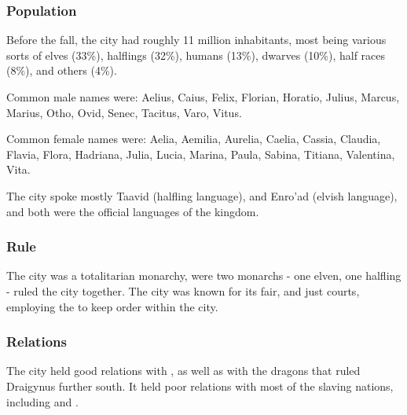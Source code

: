 \subsubsection{Population}

Before the fall, the city had roughly 11 million inhabitants, most being
various sorts of elves (33\%), halflings (32\%), humans (13\%), dwarves
(10\%), half races (8\%), and others (4\%).

Common male names were: Aelius, Caius, Felix, Florian, Horatio, Julius, Marcus,
Marius, Otho, Ovid, Senec, Tacitus, Varo, Vitus.

Common female names were: Aelia, Aemilia, Aurelia, Caelia, Cassia, Claudia,
Flavia, Flora, Hadriana, Julia, Lucia, Marina, Paula, Sabina, Titiana,
Valentina, Vita.

The city spoke mostly Taavid (halfling language), and Enro'ad (elvish language),
and both were the official languages of the kingdom.

\subsubsection{Rule}

The city was a totalitarian monarchy, were two monarchs - one elven, one
halfling - ruled the city together. The city was known for its fair, and just
courts, employing the  to keep order within the
city.

\subsubsection{Relations}

The city held good relations with , as well as with the
dragons that ruled Draigynus further south. It held poor relations with most
of the slaving nations, including  and
.
